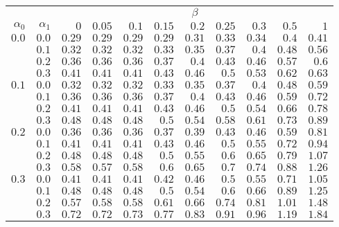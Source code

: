 \begin{tabular}{rr|rrrrrrrrr}
\hline\hline
 && \multicolumn{9}{c}{$\beta$}\\
 $\alpha_0$ & $\alpha_1$ & $0$ & $0.05$ & $0.1$ & $0.15$ & $0.2$ & $0.25$ & $0.3$ & $0.5$ & $1$ \\ 
 \hline
$0.0$ & $0.0$ & $0.29$ & $0.29$ & $0.29$ & $0.29$ & $0.31$ & $0.33$ & $0.34$ & $0.4$ & $0.41$\\ 
 & $0.1$ & $0.32$ & $0.32$ & $0.32$ & $0.33$ & $0.35$ & $0.37$ & $0.4$ & $0.48$ & $0.56$\\ 
 & $0.2$ & $0.36$ & $0.36$ & $0.36$ & $0.37$ & $0.4$ & $0.43$ & $0.46$ & $0.57$ & $0.6$\\ 
 & $0.3$ & $0.41$ & $0.41$ & $0.41$ & $0.43$ & $0.46$ & $0.5$ & $0.53$ & $0.62$ & $0.63$\\ 
\hline 
 $0.1$ & $0.0$ & $0.32$ & $0.32$ & $0.32$ & $0.33$ & $0.35$ & $0.37$ & $0.4$ & $0.48$ & $0.59$\\ 
 & $0.1$ & $0.36$ & $0.36$ & $0.36$ & $0.37$ & $0.4$ & $0.43$ & $0.46$ & $0.59$ & $0.72$\\ 
 & $0.2$ & $0.41$ & $0.41$ & $0.41$ & $0.43$ & $0.46$ & $0.5$ & $0.54$ & $0.66$ & $0.78$\\ 
 & $0.3$ & $0.48$ & $0.48$ & $0.48$ & $0.5$ & $0.54$ & $0.58$ & $0.61$ & $0.73$ & $0.89$\\ 
\hline 
 $0.2$ & $0.0$ & $0.36$ & $0.36$ & $0.36$ & $0.37$ & $0.39$ & $0.43$ & $0.46$ & $0.59$ & $0.81$\\ 
 & $0.1$ & $0.41$ & $0.41$ & $0.41$ & $0.43$ & $0.46$ & $0.5$ & $0.55$ & $0.72$ & $0.94$\\ 
 & $0.2$ & $0.48$ & $0.48$ & $0.48$ & $0.5$ & $0.55$ & $0.6$ & $0.65$ & $0.79$ & $1.07$\\ 
 & $0.3$ & $0.58$ & $0.57$ & $0.58$ & $0.6$ & $0.65$ & $0.7$ & $0.74$ & $0.88$ & $1.26$\\ 
\hline 
 $0.3$ & $0.0$ & $0.41$ & $0.41$ & $0.41$ & $0.42$ & $0.46$ & $0.5$ & $0.55$ & $0.71$ & $1.05$\\ 
 & $0.1$ & $0.48$ & $0.48$ & $0.48$ & $0.5$ & $0.54$ & $0.6$ & $0.66$ & $0.89$ & $1.25$\\ 
 & $0.2$ & $0.57$ & $0.58$ & $0.58$ & $0.61$ & $0.66$ & $0.74$ & $0.81$ & $1.01$ & $1.48$\\ 
 & $0.3$ & $0.72$ & $0.72$ & $0.73$ & $0.77$ & $0.83$ & $0.91$ & $0.96$ & $1.19$ & $1.84$\\ 
 \hline 
 \end{tabular}